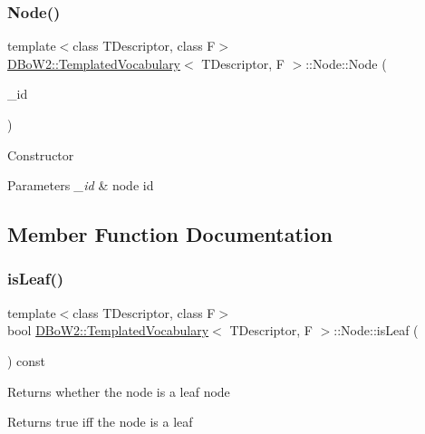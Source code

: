 \subsubsection{\texorpdfstring{Node()}{Node()}\hspace{0.1cm}{\footnotesize\ttfamily [2/2]}}
{\footnotesize\ttfamily template$<$class T\+Descriptor, class F$>$ \\
\mbox{\hyperlink{class_d_bo_w2_1_1_templated_vocabulary}{D\+Bo\+W2\+::\+Templated\+Vocabulary}}$<$ T\+Descriptor, F $>$\+::Node\+::\+Node (\begin{DoxyParamCaption}\item[{\mbox{\hyperlink{namespace_d_bo_w2_a3a0fa9c50c0df508759362d6204566f2}{Node\+Id}}}]{\+\_\+id }\end{DoxyParamCaption})\hspace{0.3cm}{\ttfamily [inline]}}

Constructor 
\begin{DoxyParams}{Parameters}
{\em \+\_\+id} & node id \\
\hline
\end{DoxyParams}


\subsection{Member Function Documentation}
\mbox{\label{struct_d_bo_w2_1_1_templated_vocabulary_1_1_node_a050a0ee173dd58475dd2ab84e6f215e8}} 
\subsubsection{\texorpdfstring{is\+Leaf()}{isLeaf()}}
{\footnotesize\ttfamily template$<$class T\+Descriptor, class F$>$ \\
bool \mbox{\hyperlink{class_d_bo_w2_1_1_templated_vocabulary}{D\+Bo\+W2\+::\+Templated\+Vocabulary}}$<$ T\+Descriptor, F $>$\+::Node\+::is\+Leaf (\begin{DoxyParamCaption}{ }\end{DoxyParamCaption}) const\hspace{0.3cm}{\ttfamily [inline]}}

Returns whether the node is a leaf node \begin{DoxyReturn}{Returns}
true iff the node is a leaf 
\end{DoxyReturn}


